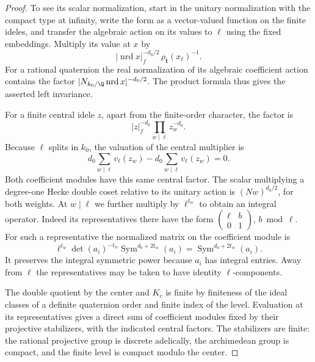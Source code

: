 \begin{proof}
To see its scalar normalization, start in the unitary
normalization with the compact type at infinity, write
the form as a vector-valued function on the finite ideles,
and transfer the algebraic action on its values to \(\ell\)
using the fixed embeddings. Multiply its value at \(x\) by
\[
 |\operatorname{nrd}x|_f^{-d_0/2}\,
                \rho_{\mathbf t}(x_\ell)^{-1}.
\]
For a rational quaternion the real normalization of its
algebraic coefficient action contains the factor
\(|N_{k_0/\Q}\operatorname{nrd}x|^{-d_0/2}\). The product
formula thus gives the asserted left invariance.

For a finite central idele \(z\), apart from the finite-order
character, the factor is
\[
             |z|_f^{-d_0}\prod_{w\mid\ell}z_w^{-d_0}.
\]
Because \(\ell\) splits in \(k_0\), the valuation of the
central multiplier is
\[
  d_0\sum_{w\mid\ell}v_\ell(z_w)
                       -d_0\sum_{w\mid\ell}v_\ell(z_w)=0 .
\]
Both coefficient modules have this same central factor. The scalar multiplying a
degree-one Hecke double coset relative to its unitary action
is \((Nw)^{d_0/2}\), for both weights. At \(w\mid\ell\) we
further multiply by \(\ell^{t_w}\) to obtain an integral
operator. Indeed its representatives there have the form
\(\left(\begin{smallmatrix}\ell&b\\0&1\end{smallmatrix}\right)\),
\(b\bmod\ell\). For such a representative the normalized matrix on the coefficient module is
\[
 \ell^{t_w}\det(a_i)^{-t_w}\operatorname{Sym}^{d_0+2t_w}(a_i)
 =\operatorname{Sym}^{d_0+2t_w}(a_i) .
\]
It preserves the integral symmetric power because \(a_i\) has integral entries. Away from \(\ell\) the representatives may
be taken to have identity \(\ell\)-components.

The double quotient by the center and \(K_c\) is finite by
finiteness of the ideal classes of a definite quaternion
order and finite index of the level. Evaluation at its
representatives gives a direct sum of coefficient modules
fixed by their projective stabilizers, with the indicated
central factors. The stabilizers are finite: the rational
projective group is discrete adelically, the archimedean
group is compact, and the finite level is compact modulo
the center.


\end{proof}
